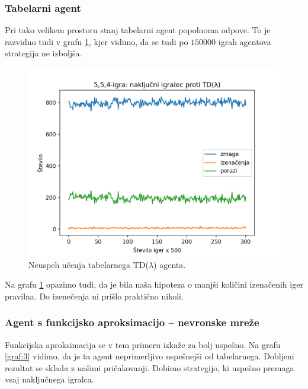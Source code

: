 \documentclass[12pt,a4paper]{amsart}
\theoremstyle{definition} %
\theoremstyle{plain} %
\begin{document}
\subsubsection{Tabelarni agent}
Pri tako velikem prostoru stanj tabelarni agent popolnoma odpove. To je razvidno tudi v grafu \ref{graf:2}, 
kjer vidimo, da se tudi po $150000$ igrah agentova strategija ne izboljša. 

\begin{figure}[H]
    \includegraphics[scale=0.715]{../rezultati/tdl-554-150000-2.png}
    \caption{Neuspeh učenja tabelarnega TD($\lambda$) agenta.}
    \label{graf:2}
\end{figure}

Na grafu \ref{graf:2} opazimo tudi, da je bila naša hipoteza o manjši količini izenačenih iger pravilna. Do izenečenja 
ni prišlo praktično nikoli.

\subsubsection{Agent s funkcijsko aproksimacijo -- nevronske mreže}
Funkcijska aproksimacija se v tem primeru izkaže za bolj uspešno. Na grafu \ref{graf:3} vidimo, da je ta agent 
neprimerljivo uspešnejši od tabelarnega. Dobljeni rezultat se sklada z našimi pričakovanji. Dobimo 
strategijo, ki uspešno premaga vsaj naključnega igralca.
\end{document}
